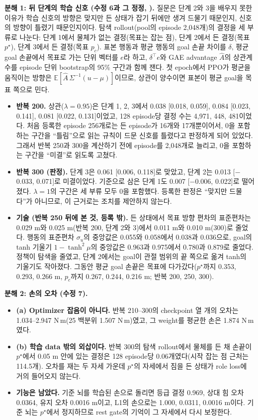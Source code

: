 \documentclass[11pt]{article}\usepackage[margin=1in]{geometry}\usepackage{amsmath,amssymb,amsthm,mathtools}\usepackage{graphicx}\graphicspath{{figures/}{../figures/}{figs/}{./}}\usepackage{enumitem}\usepackage{hyperref}\usepackage{cleveref}\usepackage{tikz}\usetikzlibrary{arrows.meta,positioning,calc,shapes.geometric}\usepackage{float}\usepackage{rotating}\usepackage[most]{tcolorbox}\usepackage{kotex}\usepackage{booktabs}\usepackage{longtable}\emergencystretch=1.6em\tolerance=2000 \crefname{assumption}{Assumption}{Assumptions}\Crefname{assumption}{Assumption}{Assumptions}\crefname{definition}{Definition}{Definitions}\Crefname{definition}{Definition}{Definitions}\crefname{proposition}{Proposition}{Propositions}\Crefname{proposition}{Proposition}{Propositions}\crefname{fact}{Fact}{Facts}\Crefname{fact}{Fact}{Facts} \newtheorem{assumption}{Assumption}\newtheorem{definition}{Definition}\newtheorem{lemma}{Lemma}\newtheorem{proposition}{Proposition}\newtheorem{theorem}{Theorem}\newtheorem{corollary}{Corollary}\newtheorem{fact}{Fact}\theoremstyle{remark}\newtheorem{remark}{Remark} \newcommand{\R}{\mathbb{R}}\newcommand{\xb}{\bar x}\newcommand{\Ab}{\bar A}\newcommand{\By}{\bar B_y}\newcommand{\U}{\mathcal U}\newcommand{\Z}{\mathcal Z}
\begin{document}
\textbf{분해 1: 뒤 단계의 학습 신호 (수정 6과 그 정정, ).} 질문은 단계 2와 3을 배우지 못한 이유가 학습 신호의 방향은 맞지만 든 상태가 잡기 뒤에만 생겨 드물기 때문인지, 신호의 방향이 틀렸기 때문인지이다. 탐색 rollout(pool의 episode 2{,}048개)의 결정을 세 부류로 나눈다: 단계 1에서 물체가 없는 결정(목표는 잡는 점), 단계 2에서 든 결정(목표 $p^\star$), 단계 3에서 든 결정(목표 $p_c$). 표본 행동과 평균 행동의 goal 손끝 차이를 $\delta$, 평균 goal 손끝에서 목표로 가는 단위 벡터를 $e$라 하고, $\delta^\top e$와 GAE advantage $\hat A$의 상관계수를 episode 단위 bootstrap의 95\% 구간과 함께 잰다. 첫 epoch에서 PPO가 평균을 움직이는 방향은 $\mathbb E[\hat A\,\Sigma^{-1}(u-\mu)]$이므로, 상관이 양수이면 표본이 평균 goal을 목표 쪽으로 민다.
\begin{itemize}
\item \textbf{반복 200.} 상관($\lambda=0.95$)은 단계 1, 2, 3에서 0.038 [0.018, 0.059], 0.084 [0.023, 0.141], 0.081 [0.022, 0.131]이었고, 128 episode당 결정 수는 4{,}971, 448, 481이었다. 처음 등록한 episode 256개로는 든 episode가 16개와 17개뿐이어서, 0을 포함하는 구간을 ``틀림''으로 읽는 규칙이 드문 신호를 틀렸다고 판정하게 되어 있었다. 그래서 반복 250과 300을 계산하기 전에 episode를 2{,}048개로 늘리고, 0을 포함하는 구간을 ``미결''로 읽도록 고쳤다.
\item \textbf{반복 300 (판정).} 단계 3은 0.061 [0.006, 0.118]로 맞았고, 단계 2는 0.013 [$-$0.033, 0.071]로 미결이었다. 기준으로 삼은 단계 1도 0.007 [$-$0.006, 0.022]로 떨어졌다. $\lambda=1$의 구간은 세 부류 모두 0을 포함했다. 등록한 판정은 ``맞지만 드물다''가 아니므로, 이 근거로는 조치를 제안하지 않는다.
\item \textbf{기술 (반복 250 뒤에 본 것, 등록 밖).} 든 상태에서 목표 방향 편차의 표준편차는 0.029 m와 0.025 m(반복 200, 단계 2와 3)에서 0.011 m와 0.010 m(300)로 줄었다. 행동의 표준편차 $\sigma_u$의 중앙값은 0.055와 0.058에서 0.038과 0.036으로, goal의 tanh 기울기 $1-\tanh^2\mu$의 중앙값은 0.963과 0.975에서 0.780과 0.879로 줄었다. 정책이 탐색을 줄였고, 단계 2에서는 goal이 관절 범위의 끝 쪽으로 옮겨 tanh의 기울기도 작아졌다.
그동안 평균 goal 손끝은 목표에 다가갔다($p^\star$까지 0.353, 0.293, 0.266 m, $p_c$까지 0.267, 0.244, 0.216 m; 반복 200, 250, 300).
\end{itemize}

\textbf{분해 2: 손의 오차 (수정 7).}
\begin{itemize}
\item \textbf{(a) Optimizer 잡음이 아니다.} 반복 210--300의 checkpoint 열 개의 오차는 1.034--2.947 N\,m(25 백분위 1.507 N\,m)였고, 그 weight를 평균한 손은 1.874 N\,m였다.
\item \textbf{(b) 학습 data 밖의 외삽이다.} 반복 300의 탐색 rollout에서 물체를 든 채 손끝이 $p^\star$에서 0.05 m 안에 있는 결정은 128 episode당 0.06개였다(시작 잡는 점 근처는 114.5개). 오차를 재는 두 자세 가운데 $p^\star$의 자세에서 짐을 든 상태가 role loss에 거의 들어오지 않는다.
\item \textbf{기능은 남았다.} 기준 뇌를 학습된 손으로 돌리면 등급 결정 0.969, 상대 힘 오차 0.0364, 유지 오차 0.0016 m이고, L1의 손으로는 1.000, 0.0311, 0.0016 m이다. 기준 뇌는 $p^\star$에서 정지하므로 rest gate의 기억이 그 자세에서 다시 보정한다.
\end{itemize}
\end{document}
